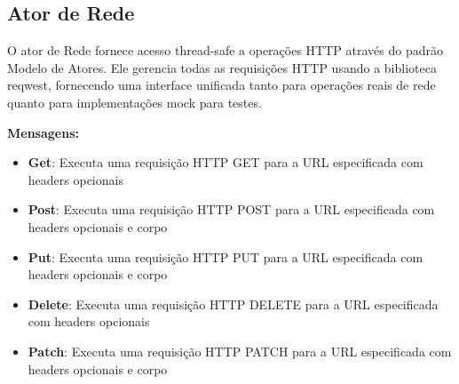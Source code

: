 \subsection{Ator de Rede}

O ator de Rede fornece acesso thread-safe a operações HTTP através do padrão Modelo de Atores. Ele gerencia todas as requisições HTTP usando a biblioteca reqwest, fornecendo uma interface unificada tanto para operações reais de rede quanto para implementações mock para testes.

\textbf{Mensagens:}

\begin{itemize}
    \item \textbf{Get}: Executa uma requisição HTTP GET para a URL especificada com headers opcionais
    \item \textbf{Post}: Executa uma requisição HTTP POST para a URL especificada com headers opcionais e corpo
    \item \textbf{Put}: Executa uma requisição HTTP PUT para a URL especificada com headers opcionais e corpo
    \item \textbf{Delete}: Executa uma requisição HTTP DELETE para a URL especificada com headers opcionais
    \item \textbf{Patch}: Executa uma requisição HTTP PATCH para a URL especificada com headers opcionais e corpo
\end{itemize}
